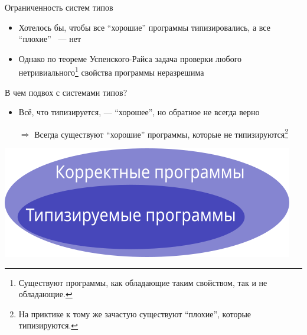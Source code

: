     \begin{frame}{Ограниченность систем типов \popslide}
        \begin{itemize}
            \item Хотелось бы, чтобы все ``хорошие'' программы типизировались, а все ``плохие'' ~--- нет
            \item Однако по теореме Успенского-Райса задача проверки любого нетривиального\footnote{Существуют программы, как обладающие таким свойством, так и не обладающие.} свойства программы неразрешима
        \end{itemize}
        \vspace{1em}
        В чем подвох с системами типов? \pause
        \begin{itemize}
            \item Всё, что типизируется, --- ``хорошее'', но обратное не всегда верно
            \item[$\Rightarrow$] Всегда существуют ``хорошие'' программы, которые не типизируются\footnote{На приктике к тому же зачастую существуют ``плохие'', которые типизируются.}
        \end{itemize}
        \begin{center}
            \includegraphics[height=0.25\textheight]{figs/types}
        \end{center}
    \end{frame}

